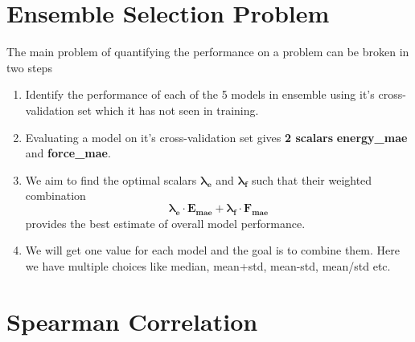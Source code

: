 \documentclass[12pt]{article}
\theoremstyle{definition}
\theoremstyle{remark}
\begin{document}
\section{Ensemble Selection Problem}
The main problem of quantifying the performance on a problem can be broken in two steps
\begin{enumerate}
    \item Identify the performance of each of the 5 models in ensemble using it's cross-validation set which it has not seen in training. 
    \item Evaluating a model on it's cross-validation set gives \textbf{2 scalars} \textbf{energy\_mae} and \textbf{force\_mae}. 
\item We aim to find the optimal scalars $\mathbf{\lambda_e}$ and $\mathbf{\lambda_f}$ such that their weighted combination
\begin{equation}
    \mathbf{\lambda_e \cdot E_{\text{mae}} + \lambda_f \cdot F_{\text{mae} }}
\end{equation}
provides the best estimate of overall model performance.
\item We will get one value for each model and the goal is to combine them. Here we have multiple choices like median, mean+std, mean-std, mean/std etc.
\end{enumerate}
\section{Spearman Correlation}
\end{document}
